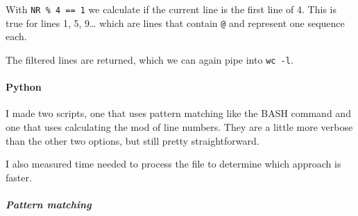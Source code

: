 With \texttt{NR\ \%\ 4\ ==\ 1} we calculate if the current line is the
first line of 4. This is true for lines 1, 5, 9\ldots{} which are lines
that contain \texttt{@} and represent one sequence each.

The filtered lines are returned, which we can again pipe into
\texttt{wc\ -l}.

\begin{Shaded}
\begin{Highlighting}[]
 \KeywordTok{|}  
\end{Highlighting}
\end{Shaded}

\hypertarget{python}{%
\paragraph{Python}\label{python}}

I made two scripts, one that uses pattern matching like the BASH command
and one that uses calculating the mod of line numbers. They are a little
more verbose than the other two options, but still pretty
straightforward.

I also measured time needed to process the file to determine which
approach is faster.

\hypertarget{pattern-matching}{%
\subparagraph{Pattern matching}\label{pattern-matching}}

